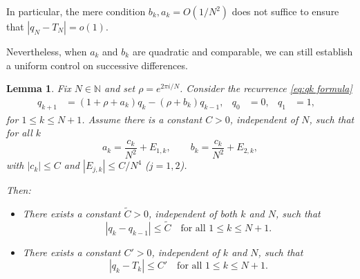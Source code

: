 \documentclass{amsart}
\newtheorem{lemma}{Lemma}
\theoremstyle{remark}
\theoremstyle{definition}
\begin{document}
In particular, the mere condition $b_k,a_k = O(1/N^2)$ does not suffice to ensure that $|q_N-T_N|=o(1)$.

Nevertheless, when $a_k$ and $b_k$ are quadratic and comparable, we can still establish a uniform control on successive differences.

\begin{lemma}\label{lem:q_kdifferencebound}
    Fix $N\in\mathbb{N}$ and set $\rho=e^{2\pi i/N}$. Consider the recurrence \eqref{eq:qk formula}
    \begin{align*}
        q_{k+1} &= (1+\rho+a_k) q_{k}-(\rho+b_k) q_{k-1}, & q_0&=0, & q_1&=1, &
    \end{align*}
    for $1\leq k\leq N+1$.
    Assume there is a constant $C>0$, independent of $N$, such that for all $k$
\[
a_k=\frac{c_k}{N^2}+E_{1,k},\qquad b_k=\frac{c_k}{N^2}+E_{2,k},
\]
with $|c_k|\le C$ and $|E_{j,k}|\le C/N^4$ ($j=1,2$). 

    Then:
    \begin{itemize}
    \item There exists a constant $\tilde{C}>0$, independent of both $k$ and $N$, such that
    \[
        |q_k - q_{k-1}| \leq \tilde{C} \quad \text{for all $1\leq k\leq N+1$}.
    \]
    \item There exists a constant $C'>0$, independent of $k$ and $N$, such that 
    \begin{equation*}
        |q_k-T_k|\leq C'  \quad \text{for all $1\leq k\leq N+1$}.
    \end{equation*}
    \end{itemize}
\end{lemma}
\end{document}
